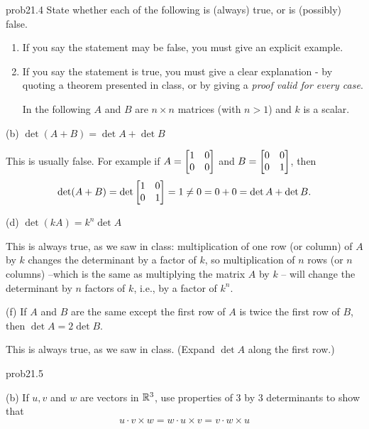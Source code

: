 \begin{sol}{prob21.4} State whether each of the following is (always) true,
or is (possibly) false.    
   \smallskip    
\begin{enumerate}[$\bullet$]
\item If you say the statement may be false, you    must give an explicit example.   
\item If you say the statement is true, you must give a clear explanation -   by quoting a theorem presented in class, or by giving a {\it proof valid for every  case}. 

\medskip In the following $A$ and $B$ are $n\times n$ matrices (with $n>1$) and $k$ is a scalar.
\end{enumerate}
\medskip

(b) $\det (A +B) = \det A +\det B$

\soln This is usually false. For example if $A=\bmatrix 1&0\cr0&0\endbmatrix$ and $B=\bmatrix 0&0\cr0&1\endbmatrix$, then $$\det(A+B)=\det \bmatrix 1&0\cr0&1\endbmatrix =1 \not= 0=0+0= \det A + \det B.$$ 
\medskip

(d) $\det (k A)= k^n \det A$

\soln This is always true, as we saw in class: multiplication of one row (or column) of $A$ by $k$ changes the determinant by a factor of $k$, so multiplication of $n$ rows (or $n$ columns) --which is the same  as multiplying the matrix $A$ by $k$ -- will change the determinant by $n$ factors of $k$, i.e., by a factor of $k^n$.
\medskip
%

(f) If $A$ and $B$ are the same except the first row of $A$ is twice the first row of $B$, then $\det A=2 \det B$.

\soln This is always true, as we saw in class. (Expand $\det A$ along the first row.)
\medskip

\end{sol}\begin{sol}{prob21.5}
\medskip
 

(b) If   $u, v$ and $w$ are  vectors in $\mathbb{R}^3$, use properties of 3 by 3 determinants to show that $$ u\cdot v\times w=  w\cdot u\times v= v\cdot w\times u$$


\end{sol}

